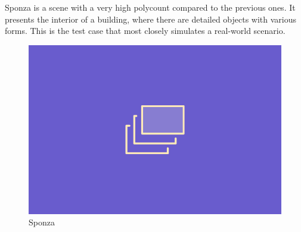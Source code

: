 \documentclass{PoliMi_MasterThesis}
\begin{document}
\begin{minipage}{0.55\textwidth}
	Sponza is a scene with a very high polycount compared to the previous ones. It presents the interior of a building, where there are detailed objects with various forms. This is the test case that most closely simulates a real-world scenario.
\end{minipage}
\hfill \begin{minipage}{0.4\textwidth}
	\begin{figure}[H]
		\includegraphics[width=\textwidth]{Images/TODO.png}
		\caption{Sponza}
		\label{fig:sponza}
	\end{figure}
\end{minipage}
\end{document}
